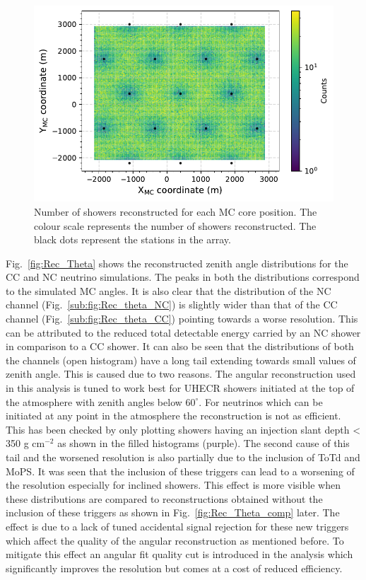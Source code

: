 \begin{figure}[h!]
  \centering
  \includegraphics[width=14.5cm]{thesis_figures/Nu_analysis/MC_control/Core_position_Profile_MC_wnt_redcut.pdf}
  \caption{Number of showers reconstructed for each MC core position. The colour scale represents the number of showers reconstructed. The black dots represent the stations in the array.}
  \label{fig:Core_XY_rec}
\end{figure}
Fig.~\ref{fig:Rec_Theta} shows the reconstructed zenith angle distributions for the CC and NC neutrino simulations. The peaks in both the distributions correspond to the simulated MC angles. It is also clear that the distribution of the NC channel (Fig.~\ref{sub:fig:Rec_theta_NC}) is slightly wider than that of the CC channel (Fig.~\ref{sub:fig:Rec_theta_CC}) pointing towards a worse resolution. This can be attributed to the reduced total detectable energy carried by an NC shower in comparison to a CC shower. It can also be seen that the distributions of both the channels (open histogram) have a long tail extending towards small values of zenith angle. This is caused due to two reasons. The angular reconstruction used in this analysis is tuned to work best for UHECR showers initiated at the top of the atmosphere with zenith angles below $60^{\circ}$. For neutrinos which can be initiated at any point in the atmosphere the reconstruction is not as efficient. This has been checked by only plotting showers having an injection slant depth < 350 g cm$^{-2}$ as shown in the filled histograms (purple). The second cause of this tail and the worsened resolution is also partially due to the inclusion of ToTd and MoPS. It was seen that the inclusion of these triggers can lead to a worsening of the resolution especially for inclined showers. This effect is more visible when these distributions are compared to reconstructions obtained without the inclusion of these triggers as shown in Fig.~\ref{fig:Rec_Theta_comp} later. The effect is due to a lack of tuned accidental signal rejection for these new triggers which affect the quality of the angular reconstruction as mentioned before. To mitigate this effect an angular fit quality cut is introduced in the analysis which significantly improves the resolution but comes at a cost of reduced efficiency.

